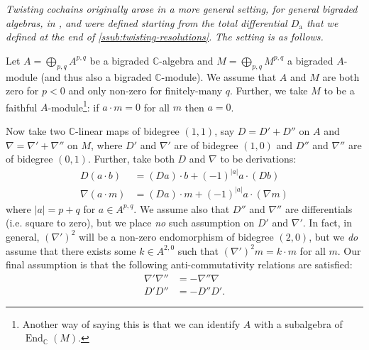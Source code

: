 \documentclass[11pt,notitlepage]{article}
\numberwithin{equation}{subsection}
\DeclareMathOperator{\End}{End}
\begin{document}
                \emph{Twisting cochains originally arose in a more general setting, for general bigraded algebras, in \cite[§8]{Toledo:1976gy}, and were defined starting from the total differential $D_\mathrm{a}$ that we defined at the end of \cref{ssub:twisting-resolutions}.}
                \emph{The setting is as follows.}

                \bigskip

                Let $A=\bigoplus_{p,q}A^{p,q}$ be a bigraded $\mathbb{C}$-algebra and $M=\bigoplus_{p,q}M^{p,q}$ a bigraded $A$-module (and thus also a bigraded $\mathbb{C}$-module).
                We assume that $A$ and $M$ are both zero for $p<0$ and only non-zero for finitely-many $q$.
                Further, we take $M$ to be a faithful $A$-module\footnote{Another way of saying this is that we can identify $A$ with a subalgebra of $\End_\mathbb{C}(M)$.}: if $a\cdot m=0$ for all $m$ then $a=0$.

                Now take two $\mathbb{C}$-linear maps of bidegree $(1,1)$, say $D=D'+D''$ on $A$ and $\nabla=\nabla'+\nabla''$ on $M$, where $D'$ and $\nabla'$ are of bidegree $(1,0)$ and $D''$ and $\nabla''$ are of bidegree $(0,1)$.
                Further, take both $D$ and $\nabla$ to be derivations:
                \begin{align*}
                    D(a\cdot b) &= (Da)\cdot b + (-1)^{|a|}a\cdot(Db)\\
                    \nabla(a\cdot m) &= (Da)\cdot m + (-1)^{|a|}a\cdot(\nabla m)
                \end{align*}
                where $|a|=p+q$ for $a\in A^{p,q}$.
                We assume also that $D''$ and $\nabla''$ are differentials (i.e. square to zero), but we place \textit{no} such assumption on $D'$ and $\nabla'$.
                In fact, in general, $(\nabla')^2$ will be a non-zero endomorphism of bidegree $(2,0)$, but we \textit{do} assume that there exists some $k\in A^{2,0}$ such that $(\nabla')^2m=k\cdot m$ for all $m$.
                Our final assumption is that the following anti-commutativity relations are satisfied:
                \begin{align*}
                    \nabla'\nabla'' &= -\nabla''\nabla\\
                    D'D'' &= - D''D'.
                \end{align*}

                \bigskip
\end{document}
